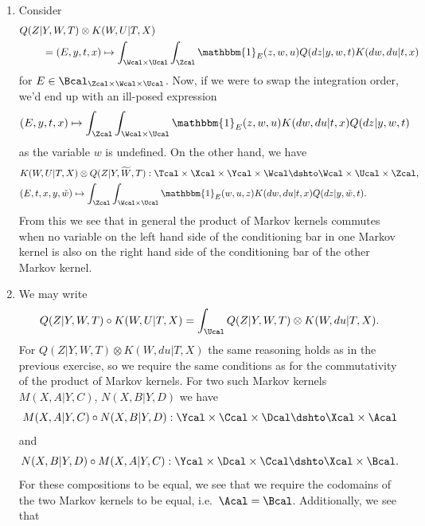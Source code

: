 \begin{enumerate}[label=3.\arabic*]
\begin{ungradedsolution}
\begin{enumerate}
\begin{align*}
            \end{align*}
            \item Consider
            \begin{align*}
                Q(Z | & Y, W, T) \otimes K(W, U|T, X)                                                                                     \\
                      & = (E, y, t, x) \mapsto \int_{\Wcal\times \Ucal}\int_{\Zcal} \mathbbm{1}_{E}(z, w, u)Q(dz | y,w, t)K(dw, du| t, x)
            \end{align*}
            for $E \in \Bcal_{\Zcal\times\Wcal\times\Ucal}$. Now, if we were to swap the integration order, we'd end up with an ill-posed expression
            \begin{align*}
                (E, y, t, x) \mapsto \int_{\Zcal}\int_{\Wcal\times \Ucal} \mathbbm{1}_{E}(z, w, u)K(dw, du| t, x) Q(dz | y,w, t)
            \end{align*}
            as the variable $w$ is undefined. On the other hand, we have
            \begin{align*}
                 & K(W, U|T, X) \otimes Q(Z | Y, \widetilde{W}, T) : \Tcal \times \Xcal \times \Ycal \times \Wcal \dshto \Wcal \times \Ucal \times \Zcal, \\
                 & (E, t, x, y, \tilde{w}) \mapsto \int_{\Zcal}\int_{\Wcal\times \Ucal} \mathbbm{1}_{E}(w, u, z)K(dw, du|t, x)Q(dz|y, \tilde{w}, t).
            \end{align*}
            From this we see that in general the product of Markov kernels commutes when no variable on the left hand side of the conditioning bar in one Markov kernel is also on the right hand side of the conditioning bar of the other Markov kernel.
            \item We may write
            $$Q(Z | Y, W, T) \circ K(W, U|T, X) = \int_\Ucal Q(Z | Y, W, T) \otimes K(W, du|T, X).$$ For $Q(Z | Y, W, T) \otimes K(W, du|T, X)$ the same reasoning holds as in the previous exercise, so we require the same conditions as for the commutativity of the product of Markov kernels. For two such Markov kernels $M(X, A| Y, C)$, $N(X, B| Y, D)$ we have
            $$M(X, A| Y, C) \circ N(X, B| Y, D): \Ycal \times \Ccal \times \Dcal \dshto \Xcal \times \Acal$$
            and
            $$N(X, B| Y, D) \circ M(X, A| Y, C): \Ycal \times \Dcal \times \Ccal \dshto \Xcal \times \Bcal.$$
            For these compositions to be equal, we see that we require the codomains of the two Markov kernels to be equal, i.e.\ $\Acal = \Bcal$. Additionally, we see that

\end{enumerate}
\end{ungradedsolution}
\end{enumerate}
